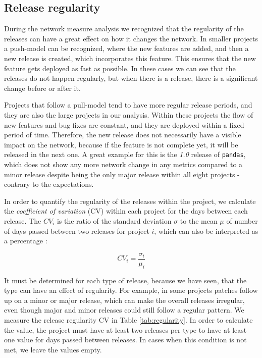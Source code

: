 \subsection{Release regularity}
\label{sec:release_reg}

During the network measure analysis we recognized that the regularity of the releases can have a great effect on how it changes the network. In smaller projects a push-model can be recognized, where the new features are added, and then a new release is created, which incorporates this feature. This ensures that the new feature gets deployed as fast as possible. In these cases we can see that the releases do not happen regularly, but when there is a release, there is a significant change before or after it.

Projects that follow a pull-model tend to have more regular release periods, and they are also the large projects in our analysis. Within these projects the flow of new features and bug fixes are constant, and they are deployed within a fixed period of time. Therefore, the new release does not necessarily have a visible impact on the network, because if the feature is not complete yet, it will be released in the next one. A great example for this is the \textit{1.0} release of \texttt{pandas}, which does not show any more network change in any metrics compared to a minor release despite being the only major release within all eight projects - contrary to the expectations.

In order to quantify the regularity of the releases within the project, we calculate the \textit{coefficient of variation} (CV) within each project for the days between each release. The $CV_i$ is the ratio of the standard deviation $\sigma$ to the mean $\mu$ of number of days passed between two releases for project $i$, which can also be interpreted as a percentage \cite{everittCambridgeDictionaryStatistics1998a}:

\[ CV_i = \frac{\sigma_i}{\mu_i} \]

It must be determined for each type of release, because we have seen, that the type can have an effect of regularity. For example, in some projects patches follow up on a minor or major release, which can make the overall releases irregular, even though major and minor releases could still follow a regular pattern. We measure the release regularity CV in Table \ref{tab:regularity}. In order to calculate the value, the project must have at least two releases per type to have at least one value for days passed between releases. In cases when this condition is not met, we leave the values empty.

